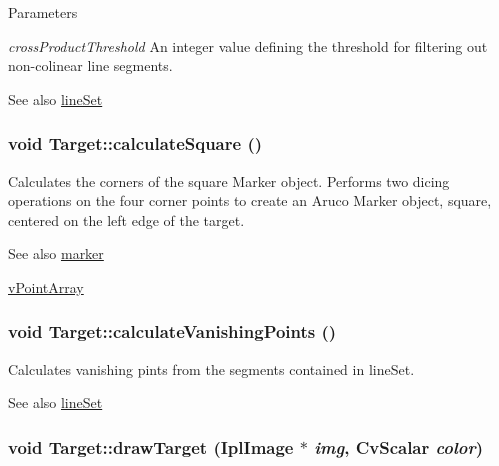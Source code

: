 \begin{DoxyParams}{Parameters}
\item[{\em crossProductThreshold}]An integer value defining the threshold for filtering out non-\/colinear line segments. \end{DoxyParams}
\begin{DoxySeeAlso}{See also}
\hyperlink{classTarget_af112a6c4b4cb598d27f33332de574680}{lineSet} 
\end{DoxySeeAlso}
\hypertarget{classTarget_aad1871823a8599d3d095c988451ad3ea}{
\subsubsection[{calculateSquare}]{\setlength{\rightskip}{0pt plus 5cm}void Target::calculateSquare ()}}
\label{classTarget_aad1871823a8599d3d095c988451ad3ea}


Calculates the corners of the square Marker object. Performs two dicing operations on the four corner points to create an Aruco Marker object, square, centered on the left edge of the target. 

\begin{DoxySeeAlso}{See also}
\hyperlink{classTarget_a631383ffe78165e8af649470edb77986}{marker} 

\hyperlink{classTarget_a55d4dc8c3f14d8229ee0d05fcebe0b42}{vPointArray} 
\end{DoxySeeAlso}
\hypertarget{classTarget_a02a9ec40b224fe31bf6635bfc78820b3}{
\subsubsection[{calculateVanishingPoints}]{\setlength{\rightskip}{0pt plus 5cm}void Target::calculateVanishingPoints ()}}
\label{classTarget_a02a9ec40b224fe31bf6635bfc78820b3}


Calculates vanishing pints from the segments contained in lineSet. 

\begin{DoxySeeAlso}{See also}
\hyperlink{classTarget_af112a6c4b4cb598d27f33332de574680}{lineSet} 
\end{DoxySeeAlso}
\hypertarget{classTarget_a81f8b1e169947fd2db3aed6356273ad2}{
\subsubsection[{drawTarget}]{\setlength{\rightskip}{0pt plus 5cm}void Target::drawTarget (IplImage $\ast$ {\em img}, \/  CvScalar {\em color})}}
\label{classTarget_a81f8b1e169947fd2db3aed6356273ad2}


